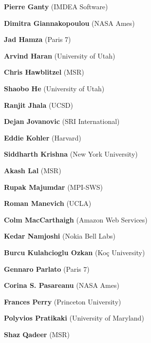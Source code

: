 \documentclass{article}
\begin{document}
\begin{commalist}
    \item {\bf Pierre Ganty} (IMDEA Software)


    \item {\bf Dimitra Giannakopoulou} (NASA Ames)


    \item {\bf Jad Hamza} (Paris 7)


    \item {\bf Arvind Haran} (University of Utah)


    \item {\bf Chris Hawblitzel} (MSR)


    \item {\bf Shaobo He} (University of Utah)


    \item {\bf Ranjit Jhala} (UCSD)


    \item {\bf Dejan Jovanovic} (SRI International)


    \item {\bf Eddie Kohler} (Harvard)


    \item {\bf Siddharth Krishna} (New York University)


    \item {\bf Akash Lal} (MSR)


    \item {\bf Rupak Majumdar} (MPI-SWS)


    \item {\bf Roman Manevich} (UCLA)


    \item {\bf Colm MacCarthaigh} (Amazon Web Services)


    \item {\bf Kedar Namjoshi} (Nokia Bell Labs)


    \item {\bf Burcu Kulahcioglu Ozkan} (Koç University)


    \item {\bf Gennaro Parlato} (Paris 7)


    \item {\bf Corina S. Pasareanu} (NASA Ames)


    \item {\bf Frances Perry} (Princeton University)


    \item {\bf Polyvios Pratikaki} (University of Maryland)


    \item {\bf Shaz Qadeer} (MSR)



\end{commalist}
\end{document}
